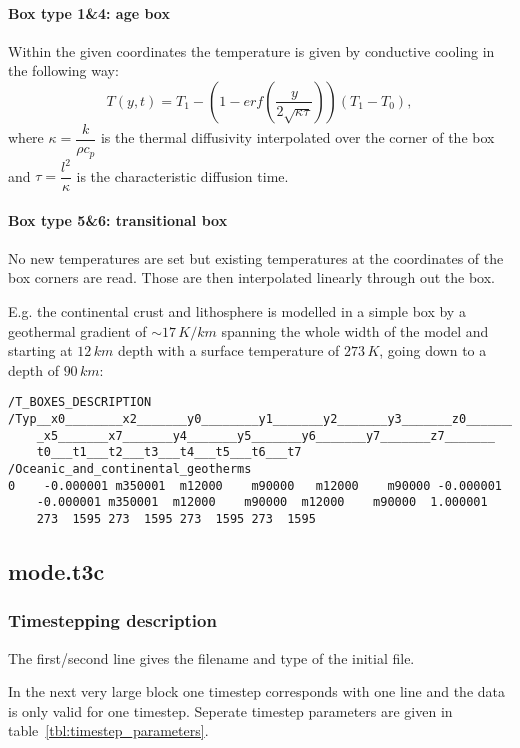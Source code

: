 \paragraph{Box type 1\&4: age box}
Within the given coordinates the temperature is given by conductive cooling in the following way:
\begin{equation}\label{eqs:cond_cooling}
T(y,t)=T_1-(1-erf(\dfrac{y}{2\sqrt{\kappa\tau}}))(T_1-T_0),
\end{equation}
where $\kappa=\dfrac{k}{\rho c_p}$ is the thermal diffusivity interpolated over the corner of the box and $\tau=\dfrac{l^2}{\kappa}$ is the characteristic diffusion time.

\paragraph{Box type 5\&6: transitional box}
No new temperatures are set but existing temperatures at the coordinates of the box corners are read. Those are then interpolated linearly through out the box.

E.g. the continental crust and lithosphere is modelled in a simple box by a geothermal gradient of $\sim17\,K/km$ spanning the whole width of the model and starting at $12\,km$ depth with a surface temperature of $273\,K$, going down to a depth of $90\,km$:
\lstset{basicstyle=\small}
\begin{lstlisting}
/T_BOXES_DESCRIPTION
/Typ__x0________x2_______y0________y1_______y2_______y3_______z0_______
	_x5_______x7_______y4_______y5_______y6_______y7_______z7_______
	t0___t1___t2___t3___t4___t5___t6___t7
/Oceanic_and_continental_geotherms
0    -0.000001 m350001  m12000    m90000   m12000    m90000 -0.000001
	-0.000001 m350001  m12000    m90000  m12000    m90000  1.000001
	273  1595 273  1595 273  1595 273  1595
\end{lstlisting}

\subsection{mode.t3c}

\subsubsection{Timestepping description}

The first/second line gives the filename and type of the initial file.

In the next very large block one timestep corresponds with one line and the data is only valid for one timestep. Seperate timestep parameters are given in table~\ref{tbl:timestep_parameters}.

